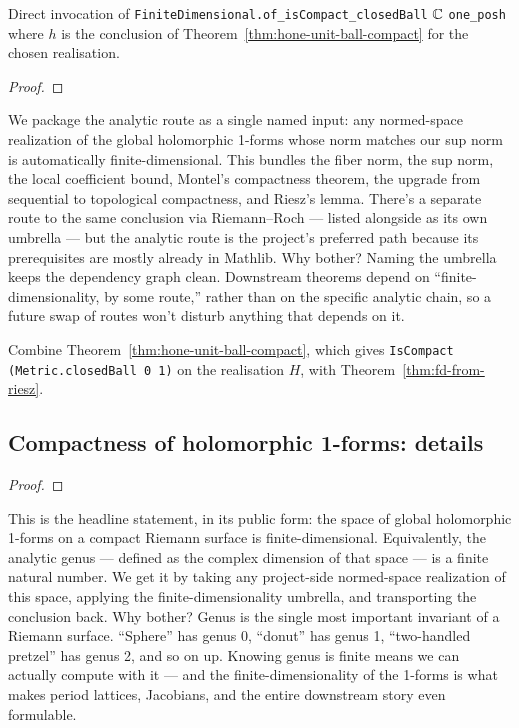 \begin{proofsketch}
Direct invocation of
\texttt{FiniteDimensional.of\_isCompact\_closedBall} \(\mathbb{C}\) \texttt{one\_pos\;h}
where \(h\) is the conclusion of
Theorem~\ref{thm:hone-unit-ball-compact} for the chosen realisation.
\end{proofsketch}


\begin{proof}\leanok\end{proof}

\begin{layman}
We package the analytic route as a single named input: any normed-space
realization of the global holomorphic 1-forms whose norm matches our
sup norm is automatically finite-dimensional. This bundles the fiber
norm, the sup norm, the local coefficient bound, Montel's compactness
theorem, the upgrade from sequential to topological compactness, and
Riesz's lemma. There's a separate route to the same conclusion via
Riemann--Roch --- listed alongside as its own umbrella --- but the analytic
route is the project's preferred path because its prerequisites are
mostly already in Mathlib. Why bother? Naming the umbrella keeps the
dependency graph clean. Downstream theorems depend on
``finite-dimensionality, by some route,'' rather than on the specific
analytic chain, so a future swap of routes won't disturb anything that
depends on it.
\end{layman}

\begin{proofsketch}
Combine Theorem~\ref{thm:hone-unit-ball-compact}, which gives
\texttt{IsCompact (Metric.closedBall 0 1)} on the realisation \(H\),
with Theorem~\ref{thm:fd-from-riesz}.
\end{proofsketch}

\subsection{Compactness of holomorphic 1-forms: details}








\begin{proof}\leanok\end{proof}

\begin{layman}
This is the headline statement, in its public form: the space of global
holomorphic 1-forms on a compact Riemann surface is finite-dimensional.
Equivalently, the analytic genus --- defined as the complex dimension of
that space --- is a finite natural number. We get it by taking any
project-side normed-space realization of this space, applying the
finite-dimensionality umbrella, and transporting the conclusion back.
Why bother? Genus is the single most important invariant of a Riemann
surface. ``Sphere'' has genus 0, ``donut'' has genus 1, ``two-handled
pretzel'' has genus 2, and so on up. Knowing genus is finite means we
can actually compute with it --- and the finite-dimensionality of the
1-forms is what makes period lattices, Jacobians, and the entire
downstream story even formulable.
\end{layman}

